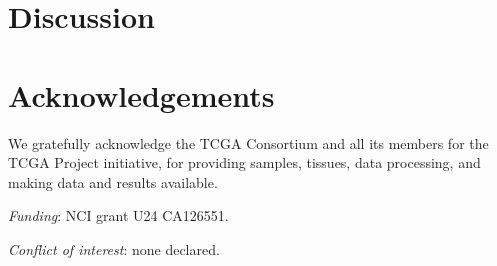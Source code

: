 \documentclass[]{bioinfo}
\begin{document}
\begin{figure}[!tpbh]
\begin{center}
\end{center}
 \caption{
 }
 \label{figROCs}
\end{figure}



\section{Discussion}
\label{secDiscussion}




\section*{Acknowledgements}
We gratefully acknowledge the TCGA Consortium and all its members for the TCGA Project initiative, for providing samples, tissues, data processing, and making data and results available.

\emph{Funding}: NCI grant U24 CA126551.

\emph{Conflict of interest}: none declared.


\begin{methods}


\end{methods}
 
\end{document}
